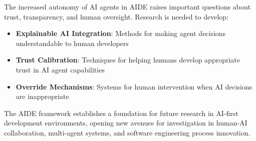 The increased autonomy of AI agents in AIDE raises important questions about trust, transparency, and human oversight. Research is needed to develop:

\begin{itemize}
    \item \textbf{Explainable AI Integration}: Methods for making agent decisions understandable to human developers
    \item \textbf{Trust Calibration}: Techniques for helping humans develop appropriate trust in AI agent capabilities
    \item \textbf{Override Mechanisms}: Systems for human intervention when AI decisions are inappropriate
\end{itemize}

The AIDE framework establishes a foundation for future research in AI-first development environments, opening new avenues for investigation in human-AI collaboration, multi-agent systems, and software engineering process innovation.
